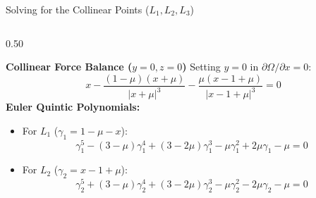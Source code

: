 \documentclass[aspectratio=169, 10pt]{beamer}
\begin{document}
\begin{frame}{Solving for the Collinear Points ($L_1, L_2, L_3$)}
    \begin{columns}[t]
        \begin{column}{0.50\textwidth}
            \begin{block}{\textbf{Collinear Force Balance ($y=0, z=0$)}}
                \scriptsize
                Setting $y = 0$ in $\partial \Omega / \partial x = 0$:
                \begin{equation*}
                    x - \frac{(1-\mu)(x+\mu)}{|x+\mu|^3} - \frac{\mu(x-1+\mu)}{|x-1+\mu|^3} = 0
                \end{equation*}
                \textbf{Euler Quintic Polynomials:}
                \begin{itemize}\setlength{\itemsep}{1.5pt}
                    \item For $L_1$ ($\gamma_1 = 1 - \mu - x$):
                    {\tiny
                    \begin{equation*}
                        \gamma_1^5 - (3-\mu)\gamma_1^4 + (3-2\mu)\gamma_1^3 - \mu\gamma_1^2 + 2\mu\gamma_1 - \mu = 0
                    \end{equation*}}
                    \item For $L_2$ ($\gamma_2 = x - 1 + \mu$):
                    {\tiny
                    \begin{equation*}
                        \gamma_2^5 + (3-\mu)\gamma_2^4 + (3-2\mu)\gamma_2^3 - \mu\gamma_2^2 - 2\mu\gamma_2 - \mu = 0
                    \end{equation*}}
                \end{itemize}
            \end{block}
        \end{column}
        

\end{columns}
\end{frame}
\end{document}
